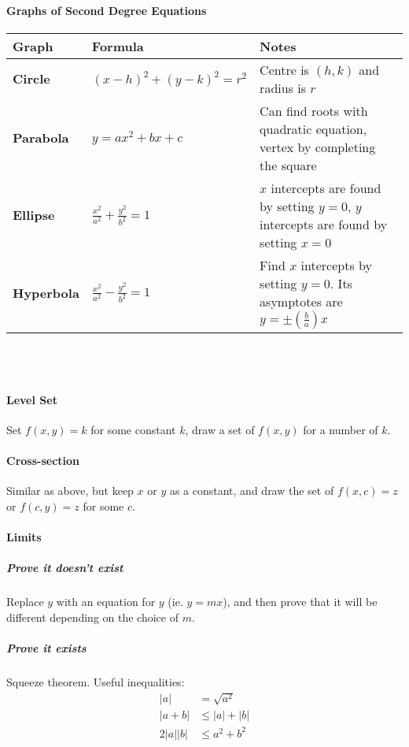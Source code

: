 \documentclass[10pt,letter]{article}
\theoremstyle{plain}
\theoremstyle{definition}
\begin{document}
\paragraph{Graphs of Second Degree Equations}\mbox{}\newline

\begin{tabular}{|p{2cm}|p{4cm}|p{7cm}|}\\
\hline
\textbf{Graph}     & \textbf{Formula} & \textbf{Notes} \\ \hline
\textbf{Circle}    & $(x-h)^2+(y-k)^2=r^2$               & Centre is $(h,k)$ and radius is $r$  \\\hline
\textbf{Parabola}  & $y=ax^2+bx+c$                       & Can find roots with quadratic equation, vertex by completing the square\\\hline   
\textbf{Ellipse}   & $\frac{x^2}{a^2}+\frac{y^2}{b^2}=1$ & $x$ intercepts are found by setting $y=0$, $y$ intercepts are found by setting $x=0$\\\hline
\textbf{Hyperbola} & $\frac{x^2}{a^2}-\frac{y^2}{b^2}=1$ & Find $x$ intercepts by setting $y=0$. Its asymptotes are $y=\pm\left(\frac{b}{a}\right)x$  \\
\hline
\end{tabular}\\ \\
\paragraph{Level Set} Set $f(x,y)=k$ for some constant $k$, draw a set of $f(x,y)$ for a number of $k$.
\paragraph{Cross-section} Similar as above, but keep $x$ or $y$ as a constant, and draw the set of $f(x,c)=z$ or $f(c,y)=z$ for some $c$. 
\paragraph{Limits} 
\subparagraph{Prove it doesn't exist} Replace $y$ with an equation for $y$ (ie. $y=mx$), and then prove that it will be different depending on the choice of $m$.
\subparagraph{Prove it exists} Squeeze theorem. Useful inequalities: \begin{align*}|a|&=\sqrt{a^2}\\|a+b|&\leq|a|+|b|\\2|a||b|&\leq a^2+b^2\end{align*}
\end{document}

